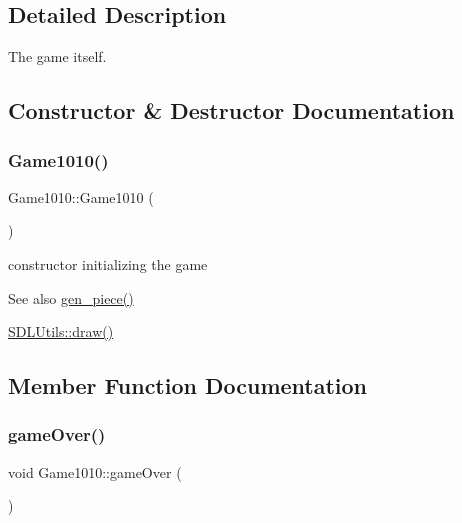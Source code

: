\subsection{Detailed Description}
The game itself. 

\subsection{Constructor \& Destructor Documentation}
\mbox{\label{class_game1010_a0a0688219844edbe8f4a44c11a13e32a}} 
\subsubsection{\texorpdfstring{Game1010()}{Game1010()}}
{\footnotesize\ttfamily Game1010\+::\+Game1010 (\begin{DoxyParamCaption}{ }\end{DoxyParamCaption})\hspace{0.3cm}{\ttfamily [inline]}}



constructor initializing the game 

\begin{DoxySeeAlso}{See also}
\mbox{\hyperlink{class_game1010_a9576170947a355682c922cb648432b9e}{gen\+\_\+piece()}} 

\mbox{\hyperlink{class_s_d_l_utils_ae7645c69b8b5104833729bec7f44163b}{S\+D\+L\+Utils\+::draw()}} 
\end{DoxySeeAlso}


\subsection{Member Function Documentation}
\mbox{\label{class_game1010_a3bc296b7ba6bffeda3baceb1240190b6}} 
\subsubsection{\texorpdfstring{game\+Over()}{gameOver()}}
{\footnotesize\ttfamily void Game1010\+::game\+Over (\begin{DoxyParamCaption}{ }\end{DoxyParamCaption})\hspace{0.3cm}{\ttfamily [inline]}}



